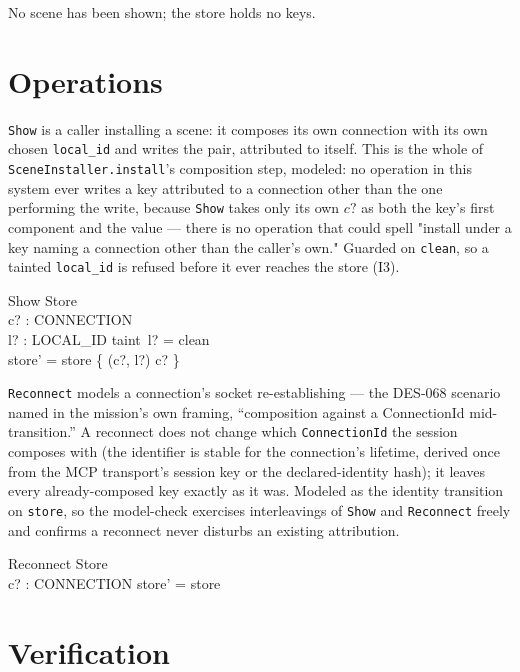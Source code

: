 \documentclass[a4paper,10pt,fleqn]{article}
\begin{document}
No scene has been shown; the store holds no keys.

\section{Operations}

\texttt{Show} is a caller installing a scene: it composes its own connection
with its own chosen \texttt{local\_id} and writes the pair, attributed to
itself. This is the whole of \texttt{SceneInstaller.install}'s composition
step, modeled: no operation in this system ever writes a key attributed to a
connection other than the one performing the write, because \texttt{Show}
takes only its own $c?$ as both the key's first component and the value ---
there is no operation that could spell "install under a key naming a
connection other than the caller's own." Guarded on \texttt{clean}, so a
tainted \texttt{local\_id} is refused before it ever reaches the store (I3).

\begin{schema}{Show}
  \Delta Store \\
  c? : CONNECTION \\
  l? : LOCAL\_ID
\where
  taint~l? = clean \\
  store' = store \oplus \{ (c?, l?) \mapsto c? \}
\end{schema}

\texttt{Reconnect} models a connection's socket re-establishing --- the DES-068
scenario named in the mission's own framing, ``composition against a
ConnectionId mid-transition.'' A reconnect does not change which
\texttt{ConnectionId} the session composes with (the identifier is stable for
the connection's lifetime, derived once from the MCP transport's session key
or the declared-identity hash); it leaves every already-composed key exactly
as it was. Modeled as the identity transition on \texttt{store}, so the
model-check exercises interleavings of \texttt{Show} and \texttt{Reconnect}
freely and confirms a reconnect never disturbs an existing attribution.

\begin{schema}{Reconnect}
  \Delta Store \\
  c? : CONNECTION
\where
  store' = store
\end{schema}

\section{Verification}
\label{sec:verification}
\end{document}
